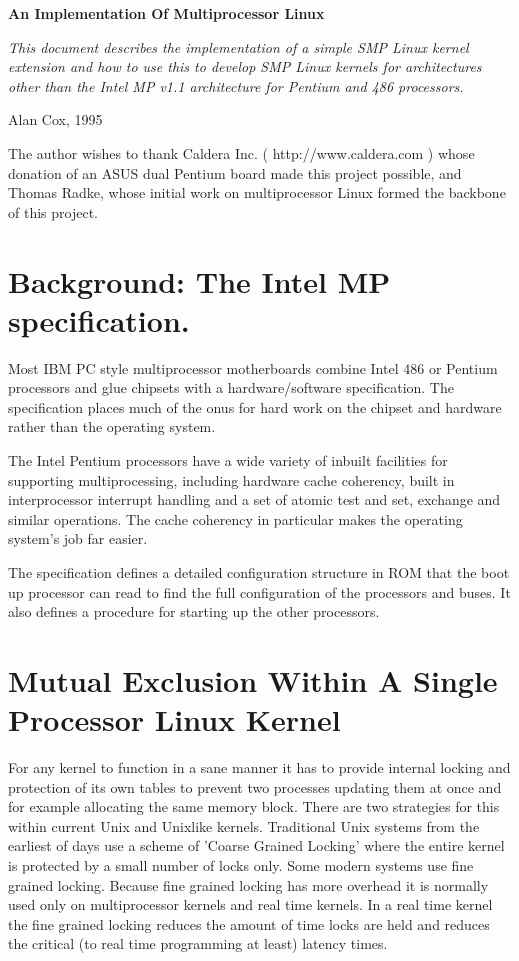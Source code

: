 \documentclass[]{article}
\begin{document}
\begin{center}
\LARGE \bf
An Implementation Of Multiprocessor Linux
\normalsize
\end{center}

{ \it
This document describes the implementation of a simple SMP 
Linux kernel extension and how to use this to develop SMP Linux kernels for 
architectures other than the Intel MP v1.1 architecture for Pentium and 486 
processors.}

\hfill Alan Cox, 1995


The author wishes to thank Caldera Inc. ( http://www.caldera.com )
whose donation of an ASUS dual Pentium board made this project possible, 
and Thomas Radke, whose initial work on multiprocessor Linux formed 
the backbone of this project.

\section{Background: The Intel MP specification.}
Most IBM PC style multiprocessor motherboards combine Intel 486 or Pentium 
processors and glue chipsets with a hardware/software specification. The 
specification places much of the onus for hard work on the chipset and 
hardware rather than the operating system.

The Intel Pentium processors have a wide variety of inbuilt facilities for 
supporting multiprocessing, including hardware cache coherency, built in 
interprocessor interrupt handling and a set of atomic test and set, 
exchange and similar operations. The cache coherency in particular makes the 
operating system's job far easier.

The specification defines a detailed configuration structure in ROM that 
the boot up processor can read to find the full configuration of the 
processors and buses. It also defines a procedure for starting up the 
other processors.


\section{Mutual Exclusion Within A Single Processor Linux Kernel}
For any kernel to function in a sane manner it has to provide internal 
locking and protection of its own tables to prevent two processes updating 
them at once and for example allocating the same memory block. There are 
two strategies for this within current Unix and Unixlike kernels. 
Traditional Unix systems from the earliest of days use a scheme of 'Coarse 
Grained Locking' where the entire kernel is protected by a small number of 
locks only. Some modern systems use fine grained locking. Because fine 
grained locking has more overhead it is normally used only on 
multiprocessor kernels and real time kernels. In a real time kernel the 
fine grained locking reduces the amount of time locks are held and reduces 
the critical (to real time programming at least) latency times.
\end{document}
